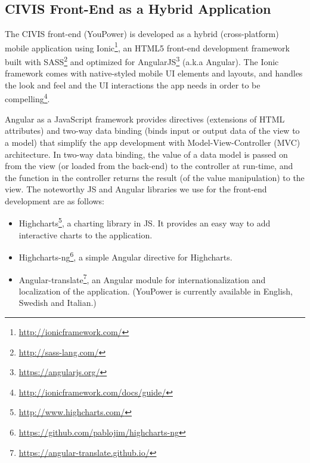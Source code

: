 \subsection{CIVIS Front-End as a Hybrid Application} 

The CIVIS front-end (YouPower) is developed as a hybrid (cross-platform) mobile application using Ionic\footnote{\url{http://ionicframework.com/}}, an HTML5 front-end development framework built with SASS\footnote{\url{http://sass-lang.com/}} and optimized for AngularJS\footnote{\url{https://angularjs.org/}} (a.k.a Angular). 
% 
The Ionic framework comes with native-styled mobile UI elements and layouts, and handles the look and feel and the UI interactions the app needs in order to be compelling\footnote{\url{http://ionicframework.com/docs/guide/}}. 

Angular as a JavaScript framework provides directives (extensions of HTML attributes) and two-way data binding (binds input or output data of the view to a model) that simplify the app development with Model-View-Controller (MVC) architecture. 
In two-way data binding, the value of a data model is passed on from the view (or loaded from the back-end) to the controller at run-time, and the function in the controller returns the result (of the value manipulation) to the view. 
% 
The noteworthy JS and Angular libraries we use for the front-end development are as follows:
\begin{itemize}
\item
 Highcharts\footnote{\url{http://www.highcharts.com/}}, a charting library in JS. It provides an easy way to add interactive charts to the application. 
\item Highcharts-ng\footnote{\url{https://github.com/pablojim/highcharts-ng}}, a simple Angular directive for Highcharts. 
\item Angular-translate\footnote{\url{https://angular-translate.github.io/}}, an Angular module for internationalization and localization of the application. (YouPower is currently available in English, Swedish and Italian.)

\end{itemize}